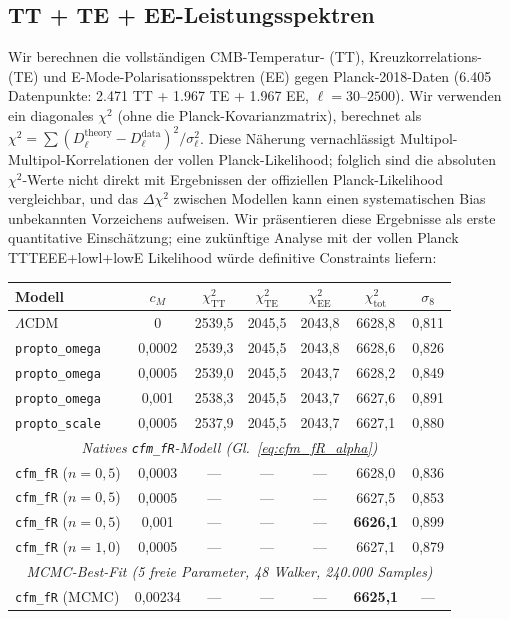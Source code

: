 \documentclass[11pt,a4paper]{article}
\begin{document}
\subsection{TT + TE + EE-Leistungsspektren}

Wir berechnen die vollst\"andigen CMB-Temperatur- (TT), Kreuzkorrelations- (TE) und E-Mode-Polarisationsspektren (EE) gegen Planck-2018-Daten (6.405 Datenpunkte: 2.471 TT + 1.967 TE + 1.967 EE, $\ell = 30$--$2500$). Wir verwenden ein diagonales $\chi^2$ (ohne die Planck-Kovarianzmatrix), berechnet als $\chi^2 = \sum (D_\ell^{\mathrm{theory}} - D_\ell^{\mathrm{data}})^2 / \sigma_\ell^2$. Diese N\"aherung vernachl\"assigt Multipol-Multipol-Korrelationen der vollen Planck-Likelihood; folglich sind die absoluten $\chi^2$-Werte nicht direkt mit Ergebnissen der offiziellen Planck-Likelihood vergleichbar, und das $\Delta\chi^2$ zwischen Modellen kann einen systematischen Bias unbekannten Vorzeichens aufweisen. Wir pr\"asentieren diese Ergebnisse als erste quantitative Einsch\"atzung; eine zuk\"unftige Analyse mit der vollen Planck TTTEEE+lowl+lowE Likelihood w\"urde definitive Constraints liefern:

\begin{center}
\begin{tabular}{lcccccc}
\toprule
\textbf{Modell} & $c_M$ & $\chi^2_{\mathrm{TT}}$ & $\chi^2_{\mathrm{TE}}$ & $\chi^2_{\mathrm{EE}}$ & $\chi^2_{\mathrm{tot}}$ & $\sigma_8$ \\
\midrule
$\Lambda$CDM & 0 & 2539,5 & 2045,5 & 2043,8 & 6628,8 & 0,811 \\
\texttt{propto\_omega} & 0,0002 & 2539,3 & 2045,5 & 2043,8 & 6628,6 & 0,826 \\
\texttt{propto\_omega} & 0,0005 & 2539,0 & 2045,5 & 2043,7 & 6628,2 & 0,849 \\
\texttt{propto\_omega} & 0,001 & 2538,3 & 2045,5 & 2043,7 & 6627,6 & 0,891 \\
\texttt{propto\_scale} & 0,0005 & 2537,9 & 2045,5 & 2043,7 & 6627,1 & 0,880 \\
\midrule
\multicolumn{7}{c}{\textit{Natives \texttt{cfm\_fR}-Modell (Gl.~\ref{eq:cfm_fR_alpha})}} \\
\texttt{cfm\_fR} ($n=0{,}5$) & 0,0003 & --- & --- & --- & 6628,0 & 0,836 \\
\texttt{cfm\_fR} ($n=0{,}5$) & 0,0005 & --- & --- & --- & 6627,5 & 0,853 \\
\texttt{cfm\_fR} ($n=0{,}5$) & 0,001 & --- & --- & --- & \textbf{6626,1} & 0,899 \\
\texttt{cfm\_fR} ($n=1{,}0$) & 0,0005 & --- & --- & --- & 6627,1 & 0,879 \\
\midrule
\multicolumn{7}{c}{\textit{MCMC-Best-Fit (5 freie Parameter, 48 Walker, 240.000 Samples)}} \\
\texttt{cfm\_fR} (MCMC) & 0,00234 & --- & --- & --- & \textbf{6625,1} & --- \\
\bottomrule
\end{tabular}
\end{center}
\end{document}
